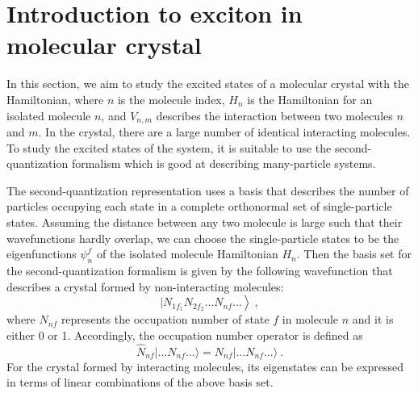 \section{Introduction to exciton in molecular crystal}
\label{sec: exciton}
In this section, we aim to study the excited states of a molecular crystal with the Hamiltonian,
where $n$ is the molecule index, $H_{n}$ is the Hamiltonian for an isolated molecule $n$, and $V_{n, m}$ describes 
the interaction between two molecules $n$ and $m$.
In the crystal, there are a large number of identical interacting molecules. To study the excited states of the system, 
it is suitable to use the second-quantization formalism which is good at describing many-particle systems. 


The second-quantization representation uses a basis that describes the number of particles occupying each state in a complete orthonormal set of single-particle states. Assuming the distance between any two molecule is large such that their wavefunctions hardly overlap, we can choose the single-particle states  to be the eigenfunctions $\psi^f_n$ of the isolated molecule Hamiltonian $H_n$.  Then the basis set for the second-quantization formalism is  
given by the following wavefunction that describes a crystal formed by non-interacting molecules:
\begin{equation}
\left. |N_{1f_{1}} N_{2f_{2}} ...N_{nf} ... \right\rangle \nonumber \ , 
\end{equation}
where $N_{nf}$ represents the occupation number of state $f$ in molecule $n$ and it is either 0 or 1. Accordingly, 
the occupation number operator is defined as
\begin{equation}
\hat{N}_{nf} |...N_{nf}...\rangle = N_{nf} |...N_{nf}...\rangle \ .
\end{equation}
For the crystal formed by interacting molecules, its eigenstates can be expressed in terms of linear combinations
of the above basis set. 

